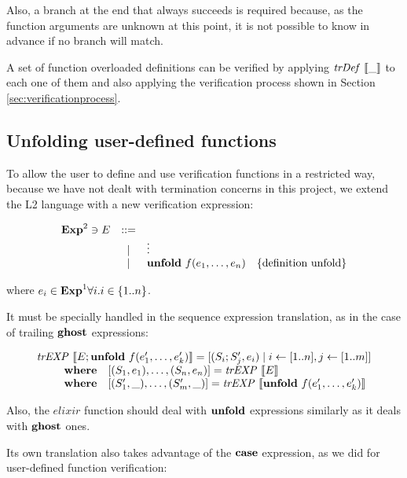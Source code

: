 Also, a branch at the end that always succeeds is required because, as the 
function arguments are unknown at this point, it is not possible to know in 
advance if no branch will match. 

A set of function overloaded definitions can be verified by applying
$\mathit{trDef}~\llbracket\_\rrbracket$ to each one of them and also applying the verification process
shown in Section \ref{sec:verificationprocess}.

\subsection{Unfolding user-defined functions}

To allow the user to define and use verification functions in a restricted way,
because we have not dealt with termination concerns in this project, we extend 
the L2 language with a new verification expression:

\[
\begin{array}{rcll}
\mathbf{Exp}^{2} \ni E & ::= & & \\
& | & \vdots \\
& | & \textbf{unfold}~f(e_1,\dots,e_n) & \{ \textrm{definition unfold} \} \\
\end{array}
\]

where $e_i \in \mathbf{Exp}^{1} \forall i. i\in \{1..n\}$.

It must be specially handled in the sequence expression translation, as 
in the case of trailing $\textbf{ghost}$ expressions:

\[
\begin{array}{l}
\mathit{trEXP}~\llbracket E;\textbf{unfold}~f(e'_1,\dots,e'_k)\rrbracket  = [(S_i;S'_j,e_i) \mid i \leftarrow [1..n], j \leftarrow [1..m]] \\
\qquad 
\begin{array}{ll}
\textbf{where} & [(S_1,e_1),\dots,(S_n, e_n)] = \mathit{trEXP}~\llbracket E\rrbracket \\
\textbf{where} & [(S'_1,\_),\dots,(S'_m, \_)] = \mathit{trEXP}~\llbracket\textbf{unfold}~f(e'_1,\dots,e'_k)\rrbracket \\
\end{array}
\end{array}
\]

Also, the $\mathit{elixir}$ function should deal with $\textbf{unfold}$ expressions 
similarly as it deals with $\textbf{ghost}$ ones.

Its own translation also takes advantage of the $\textbf{case}$ expression, as we did
for user-defined function verification:

